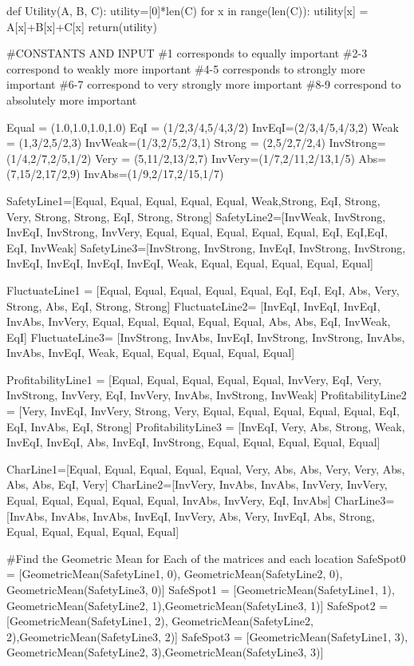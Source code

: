 \documentclass[12pt]{UIdahoMastersThesis}
\begin{document}
def Utility(A, B, C):
    utility=[0]*len(C)
    for x in range(len(C)):
        utility[x] = A[x]+B[x]+C[x]
    return(utility)




\#CONSTANTS AND INPUT
\#1 corresponds to equally important
\#2-3 correspond to weakly more important
\#4-5 corresponds to strongly more important
\#6-7 correspond to very strongly more important
\#8-9 correspond to absolutely more important

Equal = (1.0,1.0,1.0,1.0)
EqI = (1/2,3/4,5/4,3/2)
InvEqI=(2/3,4/5,4/3,2)
Weak = (1,3/2,5/2,3)
InvWeak=(1/3,2/5,2/3,1)
Strong = (2,5/2,7/2,4)
InvStrong=(1/4,2/7,2/5,1/2)
Very = (5,11/2,13/2,7)
InvVery=(1/7,2/11,2/13,1/5)
Abs=(7,15/2,17/2,9)
InvAbs=(1/9,2/17,2/15,1/7)

SafetyLine1=[Equal, Equal, Equal, Equal, Equal, Weak,Strong, EqI, Strong, Very, Strong, Strong, EqI, Strong, Strong]
SafetyLine2=[InvWeak, InvStrong, InvEqI, InvStrong, InvVery, Equal, Equal, Equal, Equal, Equal, EqI, EqI,EqI, EqI, InvWeak]
SafetyLine3=[InvStrong, InvStrong, InvEqI, InvStrong, InvStrong, InvEqI, InvEqI, InvEqI, InvEqI, Weak, Equal, Equal, Equal, Equal, Equal]

FluctuateLine1 = [Equal, Equal, Equal, Equal, Equal, EqI, EqI, EqI, Abs, Very, Strong, Abs, EqI, Strong, Strong]
FluctuateLine2= [InvEqI, InvEqI, InvEqI, InvAbs, InvVery, Equal, Equal, Equal, Equal, Equal, Abs, Abs, EqI, InvWeak, EqI]
FluctuateLine3= [InvStrong, InvAbs, InvEqI, InvStrong, InvStrong, InvAbs, InvAbs, InvEqI, Weak, Equal, Equal, Equal, Equal, Equal]

ProfitabilityLine1 = [Equal, Equal, Equal, Equal, Equal, InvVery, EqI, Very, InvStrong, InvVery, EqI, InvVery, InvAbs, InvStrong, InvWeak]
ProfitabilityLine2 = [Very, InvEqI, InvVery, Strong, Very, Equal, Equal, Equal, Equal, Equal, EqI, EqI, InvAbs, EqI, Strong]
ProfitabilityLine3 = [InvEqI, Very, Abs, Strong, Weak, InvEqI, InvEqI, Abs, InvEqI, InvStrong, Equal, Equal, Equal, Equal, Equal]

CharLine1=[Equal, Equal, Equal, Equal, Equal, Very, Abs, Abs, Very, Very, Abs, Abs, Abs, EqI, Very]
CharLine2=[InvVery, InvAbs, InvAbs, InvVery, InvVery, Equal, Equal, Equal, Equal, Equal, InvAbs, InvVery, EqI, InvAbs]
CharLine3=[InvAbs, InvAbs, InvAbs, InvEqI, InvVery, Abs, Very, InvEqI, Abs, Strong, Equal, Equal, Equal, Equal, Equal]

\#Find the Geometric Mean for Each of the matrices and each location
SafeSpot0 = [GeometricMean(SafetyLine1, 0), GeometricMean(SafetyLine2, 0), GeometricMean(SafetyLine3, 0)]
SafeSpot1 = [GeometricMean(SafetyLine1, 1), GeometricMean(SafetyLine2, 1),GeometricMean(SafetyLine3, 1)]
SafeSpot2 = [GeometricMean(SafetyLine1, 2), GeometricMean(SafetyLine2, 2),GeometricMean(SafetyLine3, 2)]
SafeSpot3 = [GeometricMean(SafetyLine1, 3), GeometricMean(SafetyLine2, 3),GeometricMean(SafetyLine3, 3)]
\end{document}
